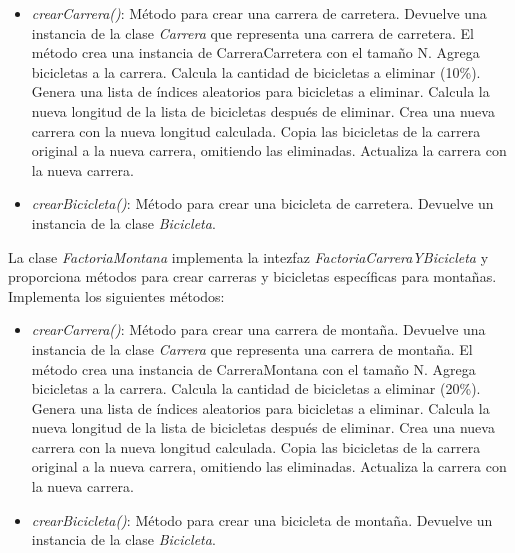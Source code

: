 \documentclass{article} %
\begin{document}
    \begin{itemize}
        \item \textit{crearCarrera()}: Método para crear una carrera de carretera. Devuelve una instancia de la clase \textit{Carrera} 
                que representa una carrera de carretera.
                El método crea una instancia de CarreraCarretera con el tamaño N. 
                Agrega bicicletas a la carrera. 
                Calcula la cantidad de bicicletas a eliminar (10\%). 
                Genera una lista de índices aleatorios para bicicletas a eliminar. 
                Calcula la nueva longitud de la lista de bicicletas después de eliminar. 
                Crea una nueva carrera con la nueva longitud calculada. 
                Copia las bicicletas de la carrera original a la nueva carrera, omitiendo las eliminadas. 
                Actualiza la carrera con la nueva carrera.
        \item \textit{crearBicicleta()}: Método para crear una bicicleta de carretera. Devuelve un instancia de la clase \textit{Bicicleta}.
    \end{itemize}

    \hspace*{1cm}La clase \textit{FactoriaMontana} implementa la intezfaz \textit{FactoriaCarreraYBicicleta} y proporciona métodos
    para crear carreras y bicicletas específicas para montañas. Implementa los siguientes métodos:

    \begin{itemize}
        \item \textit{crearCarrera()}: Método para crear una carrera de montaña. Devuelve una instancia de la clase \textit{Carrera} 
                que representa una carrera de montaña.
                El método crea una instancia de CarreraMontana con el tamaño N. 
                Agrega bicicletas a la carrera. 
                Calcula la cantidad de bicicletas a eliminar (20\%). 
                Genera una lista de índices aleatorios para bicicletas a eliminar. 
                Calcula la nueva longitud de la lista de bicicletas después de eliminar. 
                Crea una nueva carrera con la nueva longitud calculada. 
                Copia las bicicletas de la carrera original a la nueva carrera, omitiendo las eliminadas. 
                Actualiza la carrera con la nueva carrera.
        \item \textit{crearBicicleta()}: Método para crear una bicicleta de montaña. Devuelve un instancia de la clase \textit{Bicicleta}.
    \end{itemize}
\end{document}
